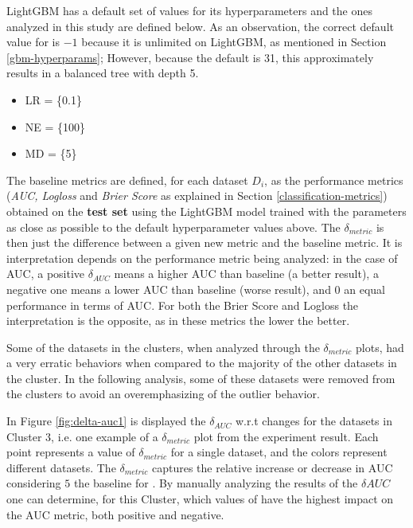 LightGBM has a default set of values for its hyperparameters and the ones analyzed in this study  are defined below. As an observation, the correct default value for  is $-1$ because it is unlimited on LightGBM, as mentioned in Section \ref{gbm-hyperparams}; However, because the  default is 31, this approximately results in a balanced tree with depth 5.

\begin{itemize}
    \item LR = \{0.1\}
    \item NE = \{100\}
    \item MD = \{5\}
\end{itemize}

The baseline metrics are defined, for each dataset $D_i$, as the performance metrics (\textit{AUC, Logloss} and \textit{Brier Score} as explained in Section \ref{classification-metrics}) obtained on the {\Large\textbf{test set}} using the LightGBM model trained with the parameters as close as possible to the default hyperparameter values above. The $\delta_{metric}$ is then just the difference between a given new metric and the baseline metric. It is interpretation depends on the performance metric being analyzed: in the case of AUC, a positive $\delta_{AUC}$ means a higher AUC than baseline (a better result), a negative one means a lower AUC than baseline (worse result), and $0$ an equal performance in terms of AUC. For both the Brier Score and Logloss the interpretation is the opposite, as in these metrics the lower the better.

Some of the datasets in the clusters, when analyzed through the $\delta_{metric}$ plots, had a very erratic behaviors when compared to the majority of the other datasets in the cluster. In the following analysis, some of these datasets were removed from the clusters to avoid an overemphasizing of the outlier behavior.

In Figure \ref{fig:delta-auc1} is displayed the $\delta_{AUC}$ w.r.t  changes for the datasets in Cluster 3, i.e. one example of a $\delta_{metric}$ plot from the experiment result. Each point represents a value of $\delta_{metric}$ for a single dataset, and the colors represent different datasets. The $\delta_{metric}$ captures the relative increase or decrease in AUC considering $5$ the baseline for . By manually analyzing the results of the $\delta{AUC}$ one can determine, for this Cluster, which values of  have the highest impact on the AUC metric, both positive and negative.

